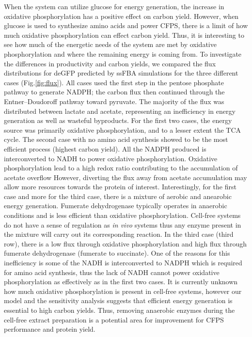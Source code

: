 \documentclass[journal=asbcd6,manuscript=article]{achemso}
\begin{document}
When the system can utilize glucose for energy generation, the increase in oxidative phosphorylation has a positive effect on carbon yield. 
However, when glucose is used to synthesize amino acids and power CFPS, there is a limit of how much oxidative phosphorylation can effect carbon yield.
Thus, it is interesting to see how much of the energetic needs of the system are met by oxidative phosphorylation and where the remaining energy is coming from. 
To investigate the differences in productivity and carbon yields, we compared the flux distributions for deGFP predicted by ssFBA simulations for the three different cases (Fig.\ref{fig:flux}).
All cases used the first step in the pentose phosphate pathway to generate NADPH;
the carbon flux then continued through the Entner–Doudoroff pathway toward pyruvate.
The majority of the flux was distributed between lactate and acetate, representing an inefficiency in energy generation as well as wasteful byproducts.
For the first two cases, the energy source was primarily oxidative phosphorylation, and to a lesser extent the TCA cycle.
The second case with no amino acid synthesis showed to be the most efficient process (highest carbon yield).
All the NADPH produced is interconverted to NADH to power oxidative phosphorylation.
Oxidative phosphorylation lead to a high redox ratio contributing to the accumulation of acetate overflow 
However, diverting the flux away from acetate accumulation may allow more resources towards the protein of interest.
Interestingly, for the first case and more for the third case, there is a mixture of aerobic and anearobic energy generation. 
Fumerate dehydrogenase typically operates in anaerobic conditions and is less efficient than oxidative phosphorylation. 
Cell-free systems do not have a sense of regulation as \textit{in vivo} systems thus any enzyme present in the mixture will carry out its corresponding reaction.
In the third case (third row), there is a low flux through oxidative phosphorylation and high flux through fumerate dehydrogenase (fumerate to succinate). 
One of the reasons for this inefficiency is some of the NADH is interconverted to NADPH which is required for amino acid synthesis, thus the lack of NADH cannot power oxidative phosphorylation as effectively as in the first two cases.
It is currently unknown how much oxidative phosphorylation is present in cell-free systems, however our model and the sensitivity analysis suggests that efficient energy generation is essential to high carbon yields. 
Thus, removing anaerobic enzymes during the cell-free extract preparation is a potential area for improvement for CFPS performance and protein yield. 
\end{document}
